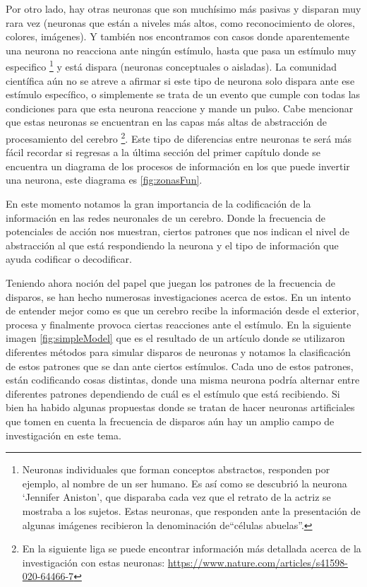 Por otro lado, hay otras neuronas que son muchísimo más pasivas y disparan muy rara vez (neuronas que están a niveles más altos, como reconocimiento de olores, colores, imágenes). Y también nos encontramos con casos donde aparentemente una neurona no reacciona ante ningún estímulo, hasta que pasa un estímulo muy especifico \footnote{Neuronas individuales que forman conceptos abstractos, responden por ejemplo, al nombre de un ser humano. Es así como se descubrió la neurona ‘Jennifer Aniston’, que disparaba cada vez que el retrato de la actriz se mostraba a los sujetos. Estas neuronas, que responden ante la presentación de algunas imágenes recibieron la denominación de“células abuelas”.} y está dispara (neuronas conceptuales o aisladas). La comunidad científica aún no se atreve a afirmar si este tipo de neurona solo dispara ante ese estímulo específico, o simplemente se trata de un evento que cumple con todas las condiciones para que esta neurona reaccione y mande un pulso. Cabe mencionar que estas neuronas se encuentran en las capas más altas de abstracción de procesamiento del cerebro \footnote{En la siguiente liga se puede encontrar información más detallada acerca de la investigación con estas neuronas: \url{https://www.nature.com/articles/s41598-020-64466-7}}. Este tipo de diferencias entre neuronas te será más fácil recordar si regresas a la última sección del primer capítulo donde se encuentra un diagrama de los procesos de información en los que puede invertir una neurona, este diagrama es \ref{fig:zonasFun}.

En este momento notamos la gran importancia de la codificación de la información en las redes neuronales de un cerebro. Donde la frecuencia de potenciales de acción nos muestran, ciertos patrones que nos indican el nivel de abstracción al que está respondiendo la neurona y el tipo de información que ayuda codificar o decodificar. 

Teniendo ahora noción del papel que juegan los patrones de la frecuencia de disparos, se han hecho numerosas investigaciones acerca de estos. En un intento de entender mejor como es que un cerebro recibe la información desde el exterior, procesa y finalmente provoca ciertas reacciones ante el estímulo. En la siguiente imagen \ref{fig:simpleModel} que es el resultado de un artículo donde se utilizaron diferentes métodos para simular disparos de neuronas y notamos la clasificación de estos patrones que se dan ante ciertos estímulos. Cada uno de estos patrones, están codificando cosas distintas, donde una misma neurona podría alternar entre diferentes patrones dependiendo de cuál es el estímulo que está recibiendo.
Si bien ha habido algunas propuestas donde se tratan de hacer neuronas artificiales que tomen en cuenta la frecuencia de disparos aún hay un amplio campo de investigación en este tema.

